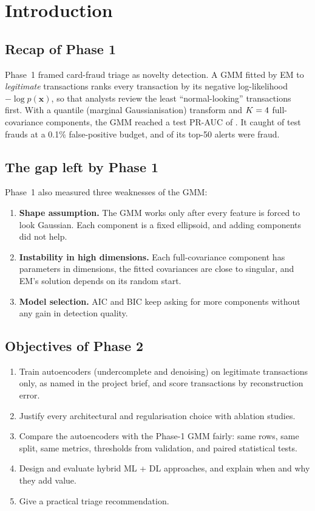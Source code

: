 \documentclass[12pt]{article}
\begin{document}
\newpage
\tableofcontents
\newpage

\section{Introduction}

\subsection{Recap of Phase 1}
Phase~1 framed card-fraud triage as novelty detection. A GMM fitted by EM to \emph{legitimate} transactions ranks every
transaction by its negative log-likelihood $-\log p(\mathbf{x})$, so that analysts review the least ``normal-looking''
transactions first. With a quantile (marginal Gaussianisation) transform and $K=4$ full-covariance components, the
GMM reached a test PR-AUC of \gmmTestAP{}. It caught \gmmRecallA{} of test frauds at a 0.1\% false-positive budget, and
\gmmPA{} of its top-50 alerts were fraud.

\subsection{The gap left by Phase 1}
Phase~1 also measured three weaknesses of the GMM:
\begin{enumerate}
\item \textbf{Shape assumption.} The GMM works only after every feature is forced to look Gaussian. Each component is a
fixed ellipsoid, and adding components did not help.
\item \textbf{Instability in high dimensions.} Each full-covariance component has \perComp{} parameters in \pOneD{}
dimensions, the fitted covariances are close to singular, and EM's solution depends on its random start.
\item \textbf{Model selection.} AIC and BIC keep asking for more components without any gain in detection quality.
\end{enumerate}

\subsection{Objectives of Phase 2}
\begin{enumerate}
\item Train autoencoders (undercomplete and denoising) on legitimate transactions only, as named in the project brief,
and score transactions by reconstruction error.
\item Justify every architectural and regularisation choice with ablation studies.
\item Compare the autoencoders with the Phase-1 GMM fairly: same rows, same split, same metrics, thresholds from
validation, and paired statistical tests.
\item Design and evaluate hybrid ML + DL approaches, and explain when and why they add value.
\item Give a practical triage recommendation.
\end{enumerate}
\end{document}
